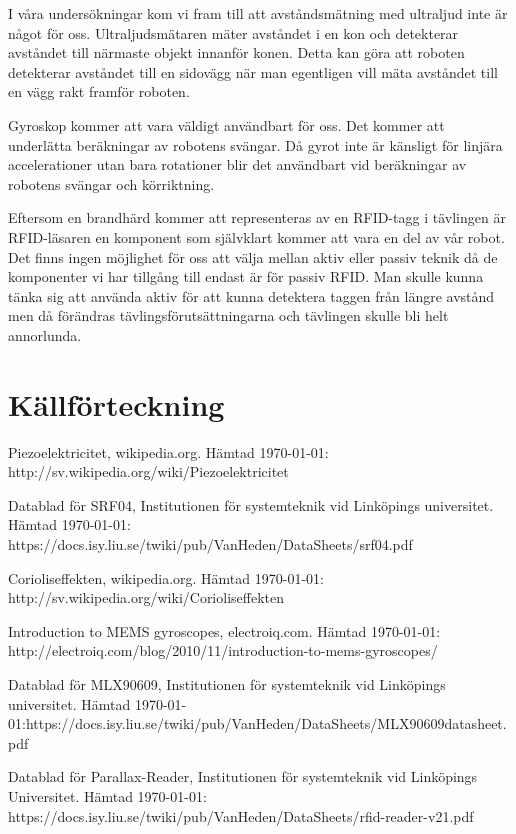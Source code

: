 \documentclass[a4paper,12pt,fleqn]{article}
\begin{document}
I våra undersökningar kom vi fram till att avståndsmätning med ultraljud inte är något för oss. Ultraljudsmätaren mäter avståndet i en kon och detekterar avståndet till närmaste objekt innanför konen. Detta kan göra att roboten detekterar avståndet till en sidovägg när man egentligen vill mäta avståndet till en vägg rakt framför roboten.

Gyroskop kommer att vara väldigt användbart för oss. Det kommer att underlätta beräkningar av robotens svängar. Då gyrot inte är känsligt för linjära accelerationer utan bara rotationer blir det användbart vid beräkningar av robotens svängar och körriktning.

Eftersom en brandhärd kommer att representeras av en RFID-tagg i tävlingen är RFID-läsaren en komponent som självklart kommer att vara en del av vår robot. Det finns ingen möjlighet för oss att välja mellan aktiv eller passiv teknik då de komponenter vi har tillgång till endast är för passiv RFID. Man skulle kunna tänka sig att använda aktiv för att kunna detektera taggen från längre avstånd men då förändras tävlingsförutsättningarna och tävlingen skulle bli helt annorlunda.


\section*{Källförteckning}
\addtocounter{section}{1}


Piezoelektricitet, wikipedia.org. Hämtad \today:\newline
http://sv.wikipedia.org/wiki/Piezoelektricitet

Datablad för SRF04, Institutionen för systemteknik vid Linköpings universitet. Hämtad \today:\newline
https://docs.isy.liu.se/twiki/pub/VanHeden/DataSheets/srf04.pdf

Corioliseffekten, wikipedia.org. Hämtad \today:\newline
http://sv.wikipedia.org/wiki/Corioliseffekten

Introduction to MEMS gyroscopes, electroiq.com. Hämtad \today:\newline
http://electroiq.com/blog/2010/11/introduction-to-mems-gyroscopes/

Datablad för MLX90609, Institutionen för systemteknik vid Linköpings universitet. Hämtad \today:\newline https://docs.isy.liu.se/twiki/pub/VanHeden/DataSheets/MLX90609datasheet.pdf

Datablad för Parallax-Reader, Institutionen för systemteknik vid Linköpings Universitet. Hämtad \today:\newline
https://docs.isy.liu.se/twiki/pub/VanHeden/DataSheets/rfid-reader-v21.pdf
\end{document}
